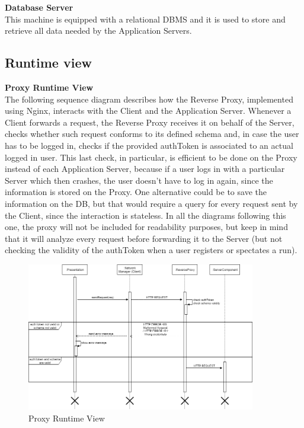 \documentclass[titlepage]{article}
\begin{document}
{\bf Database Server }\\ 
This machine is equipped with a relational DBMS and it is used to store and retrieve all data needed by the Application Servers. 

\pagebreak


\subsection{Runtime view}

{\bf Proxy Runtime View }\\ 
The following sequence diagram describes how the Reverse Proxy, implemented using Nginx, interacts with the Client and the Application Server.
Whenever a Client forwards a request, the Reverse Proxy receives it on behalf of the Server, checks whether such request conforms to its defined schema and, in case the user has to be logged in, checks if the provided authToken is associated to an actual logged in user. This last check, in particular, is efficient to be done on the Proxy instead of each Application Server, because if a user logs in with a particular Server which then crashes, the user doesn’t have to log in again, since the information is stored on the Proxy. One alternative could be to save the information on the DB, but that would require a query for every request sent by the Client, since the interaction is stateless.
In all the diagrams following this one, the proxy will not be included for readability purposes, but keep in mind that it will analyze every request before forwarding it to the Server (but not checking the validity of the authToken when a user registers or spectates a run).

\begin{figure}[H]
	\center
  	\includegraphics[width=10cm] {Proxy.png}%
  	\caption{Proxy Runtime View}
 	\label{fig:PROXY}
\end{figure}
\end{document}
